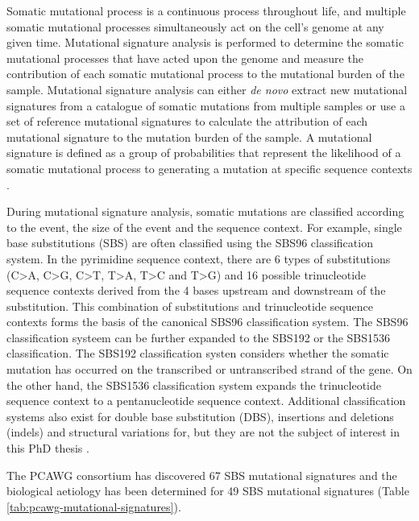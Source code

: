 Somatic mutational process is a continuous process throughout life, and multiple somatic mutational processes simultaneously act on the cell’s genome at any given time. Mutational signature analysis is performed to determine the somatic mutational processes that have acted upon the genome and measure the contribution of each somatic mutational process to the mutational burden of the sample. Mutational signature analysis can either \textit{de novo} extract new mutational signatures from a catalogue of somatic mutations from multiple samples or use a set of reference mutational signatures to calculate the attribution of each mutational signature to the mutation burden of the sample. A mutational signature is defined as a group of probabilities that represent the likelihood of a somatic mutational process to generating a mutation at specific sequence contexts \cite{Alexandrov2013-fq}.

During mutational signature analysis, somatic mutations are classified according to the event, the size of the event and the sequence context. For example, single base substitutions (SBS) are often classified using the SBS96 classification system. In the pyrimidine sequence context, there are 6 types of substitutions (C>A, C>G, C>T, T>A, T>C and T>G) and 16 possible trinucleotide sequence contexts derived from the 4 bases upstream and downstream of the substitution. This combination of substitutions and trinucleotide sequence contexts forms the basis of the canonical SBS96 classification system. The SBS96 classification systeem can be further expanded to the SBS192 or the SBS1536 classification. The SBS192 classification systen considers whether the somatic mutation has occurred on the transcribed or untranscribed strand of the gene. On the other hand, the SBS1536 classification system expands the trinucleotide sequence context to a pentanucleotide sequence context. Additional classification systems also exist for double base substitution (DBS), insertions and deletions (indels) and structural variations for, but they are not the subject of interest in this PhD thesis \cite{Alexandrov2013-kg, Alexandrov2020-ys, Li2020-vw, Steele2022-mn}.

The PCAWG consortium has discovered 67 SBS mutational signatures \cite{Alexandrov2020-ys} and the biological aetiology has been determined for 49 SBS mutational signatures (Table \ref{tab:pcawg-mutational-signatures}). 

